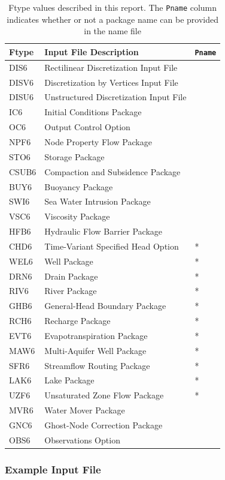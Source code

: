 \begin{table}[h]
\caption{Ftype values described in this report.  The \texttt{Pname} column indicates whether or not a package name can be provided in the name file}
\small
\begin{center}
\begin{tabular*}{\columnwidth}{l l l}
\hline
\hline
Ftype & Input File Description & \texttt{Pname}\\
\hline
DIS6 & Rectilinear Discretization Input File \\
DISV6 & Discretization by Vertices Input File \\
DISU6 & Unstructured Discretization Input File \\
IC6 & Initial Conditions Package \\
OC6 & Output Control Option \\
NPF6 & Node Property Flow Package \\ 
STO6 & Storage Package \\
CSUB6 & Compaction and Subsidence Package \\
BUY6 & Buoyancy Package \\
SWI6 & Sea Water Intrusion Package \\
VSC6 & Viscosity Package \\
HFB6 & Hydraulic Flow Barrier Package\\
CHD6 & Time-Variant Specified Head Option & * \\
WEL6 & Well Package & * \\
DRN6 & Drain Package & * \\
RIV6 & River Package & * \\
GHB6 & General-Head Boundary Package & * \\
RCH6 & Recharge Package & * \\
EVT6 & Evapotranspiration Package & * \\
MAW6 & Multi-Aquifer Well Package & * \\
SFR6 & Streamflow Routing Package & * \\
LAK6 & Lake Package & * \\
UZF6 & Unsaturated Zone Flow Package & * \\
MVR6 & Water Mover Package \\
GNC6 & Ghost-Node Correction Package \\
OBS6 & Observations Option \\
\hline 
\end{tabular*}
\label{table:ftype-gwf}
\end{center}
\normalsize
\end{table}

\vspace{5mm}
\subsubsection{Example Input File}


